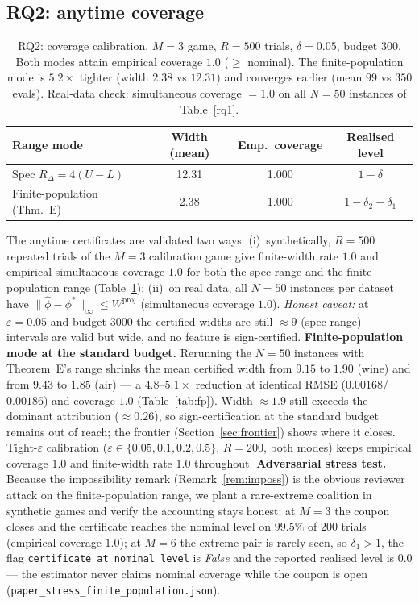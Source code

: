 \documentclass[11pt,twocolumn]{article}
\begin{document}
\subsection{RQ2: anytime coverage}\label{sec:rq2}
\begin{table}[t]\centering\small
\begin{tabular}{lccc}
\toprule
Range mode & Width (mean) & Emp.\ coverage & Realised level \\
\midrule
Spec $R_\Delta{=}4(U{-}L)$ & 12.31 & 1.000 & $1-\delta$ \\
Finite-population (Thm.~E) & 2.38 & 1.000 & $1{-}\delta_2{-}\delta_1$ \\
\bottomrule
\end{tabular}
\caption{RQ2: coverage calibration, $M{=}3$ game, $R{=}500$ trials,
$\delta{=}0.05$, budget $300$.  Both modes attain empirical coverage $1.0$
($\ge$ nominal).  The finite-population mode is $5.2\times$ tighter
(width $2.38$ vs $12.31$) and converges earlier (mean $99$ vs $350$
evals).  Real-data check: simultaneous coverage $=1.0$ on all $N=50$
instances of Table~\ref{rq1}.}
\label{rq2}
\end{table}

The anytime certificates are validated two ways: (i)~synthetically, $R=500$
repeated trials of the $M=3$ calibration game give finite-width rate $1.0$
and empirical simultaneous coverage $1.0$ for both the spec range and the
finite-population range (Table~\ref{rq2}); (ii)~on real data, all $N=50$
instances per dataset have $\|\hat\phi-\phi^*\|_\infty\le W^{\mathrm{proj}}$
(simultaneous coverage $1.0$).  \emph{Honest caveat:} at
$\varepsilon=0.05$ and budget $3000$ the certified widths are still
$\approx9$ (spec range) — intervals are valid but wide, and no feature is
sign-certified.  \textbf{Finite-population mode at the standard budget.}
Rerunning the $N=50$ instances with Theorem~E's range shrinks the mean
certified width from $9.15$ to $1.90$ (wine) and from $9.43$ to $1.85$
(air) — a $4.8$--$5.1\times$ reduction at identical RMSE
($0.00168$/$0.00186$) and coverage $1.0$ (Table~\ref{tab:fp}).  Width
$\approx1.9$ still exceeds the dominant attribution ($\approx0.26$), so
sign-certification at the standard budget remains out of reach; the
frontier (Section~\ref{sec:frontier}) shows where it closes.  Tight-$\varepsilon$
calibration ($\varepsilon\in\{0.05,0.1,0.2,0.5\}$, $R=200$, both modes)
keeps empirical coverage $1.0$ and finite-width rate $1.0$ throughout.
\textbf{Adversarial stress test.}  Because the impossibility remark
(Remark~\ref{rem:imposs}) is the obvious reviewer attack on the
finite-population range, we plant a rare-extreme coalition in synthetic
games and verify the accounting stays honest: at $M=3$ the coupon closes
and the certificate reaches the nominal level on $99.5\%$ of $200$ trials
(empirical coverage $1.0$); at $M=6$ the extreme pair is rarely seen, so
$\delta_1>1$, the flag \texttt{certificate\_at\_nominal\_level} is
\emph{False} and the reported realised level is $0.0$ — the estimator never
claims nominal coverage while the coupon is open
(\texttt{paper\_stress\_finite\_population.json}).
\end{document}
